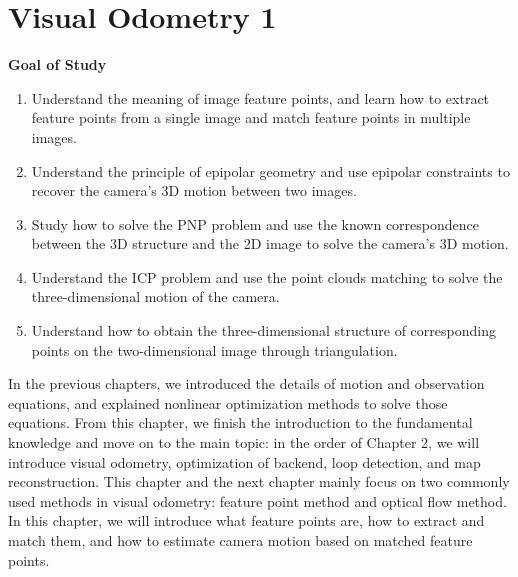 \chapter{Visual Odometry 1}
\label{cpt:7}
\thispagestyle{empty}

\begin{mdframed}  
	\textbf{Goal of Study}
	\begin{enumerate}[labelindent=0em,leftmargin=1.5em]
		\item Understand the meaning of image feature points, and learn how to extract feature points from a single image and match feature points in multiple images.
		\item Understand the principle of epipolar geometry and use epipolar constraints to recover the camera's 3D motion between two images.
		\item Study how to solve the PNP problem and use the known correspondence between the 3D structure and the 2D image to solve the camera's 3D motion.	
		\item Understand the ICP problem and use the point clouds matching to solve the three-dimensional motion of the camera.
		\item Understand how to obtain the three-dimensional structure of corresponding points on the two-dimensional image through triangulation.
	\end{enumerate}
\end{mdframed}

In the previous chapters, we introduced the details of motion and observation equations, and explained nonlinear optimization methods to solve those equations. From this chapter, we finish the introduction to the fundamental knowledge and move on to the main topic: in the order of Chapter 2, we will introduce visual odometry, optimization of backend, loop detection, and map reconstruction. This chapter and the next chapter mainly focus on two commonly used methods in visual odometry: feature point method and optical flow method. In this chapter, we will introduce what feature points are, how to extract and match them, and how to estimate camera motion based on matched feature points.

\newpage


\newpage

